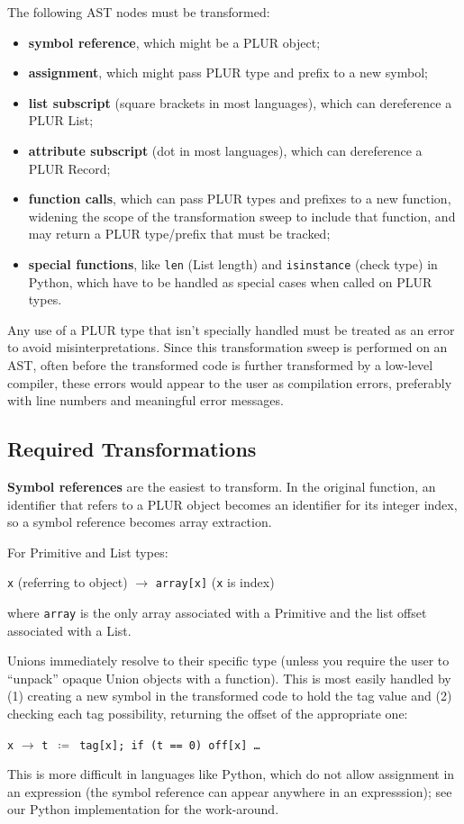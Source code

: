 \documentclass[10pt, conference, compsocconf]{IEEEtran}
\begin{document}
The following AST nodes must be transformed:
\begin{itemize}
\item {\bf symbol reference}, which might be a PLUR object;
\item {\bf assignment}, which might pass PLUR type and prefix to a new symbol;
\item {\bf list subscript} (square brackets in most languages), which can dereference a PLUR List;
\item {\bf attribute subscript} (dot in most languages), which can dereference a PLUR Record;
\item {\bf function calls}, which can pass PLUR types and prefixes to a new function, widening the scope of the transformation sweep to include that function, and may return a PLUR type/prefix that must be tracked;
\item {\bf special functions}, like {\tt len} (List length) and {\tt isinstance} (check type) in Python, which have to be handled as special cases when called on PLUR types.
\end{itemize}

Any use of a PLUR type that isn't specially handled must be treated as an error to avoid misinterpretations. Since this transformation sweep is performed on an AST, often before the transformed code is further transformed by a low-level compiler, these errors would appear to the user as compilation errors, preferably with line numbers and meaningful error messages.

\subsection{Required Transformations}

{\bf Symbol references} are the easiest to transform. In the original function, an identifier that refers to a PLUR object becomes an identifier for its integer index, so a symbol reference becomes array extraction.

For Primitive and List types:
\begin{center}
{\tt x} (referring to object) $\to$ {\tt array[x]} ({\tt x} is index)
\end{center}
where {\tt array} is the only array associated with a Primitive and the list offset associated with a List.

Unions immediately resolve to their specific type (unless you require the user to ``unpack'' opaque Union objects with a function). This is most easily handled by (1) creating a new symbol in the transformed code to hold the tag value and (2) checking each tag possibility, returning the offset of the appropriate one:
\begin{center}
{\tt x} $\to$ {\tt t $\coloneqq$ tag[x]; if (t == 0) off[x] \ldots}
\end{center}
This is more difficult in languages like Python, which do not allow assignment in an expression (the symbol reference can appear anywhere in an expresssion); see our Python implementation\cite{plur} for the work-around.
\end{document}
